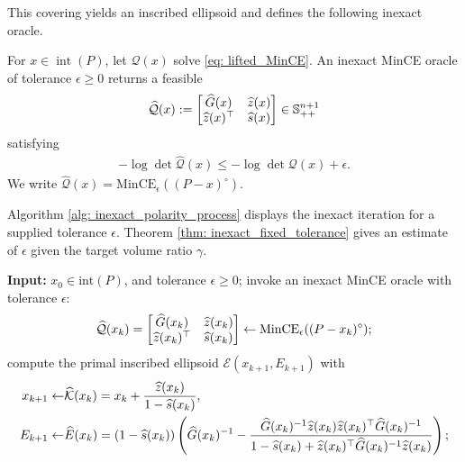 \documentclass[smallextended]{svjour3}
\newcommand{\K}{\mathcal{K}}
\newcommand{\E}{\mathcal{E}}
\newcommand{\wh}{\widehat}
\renewcommand{\S}{\mathbb{S}}
\begin{document}
This covering yields an inscribed ellipsoid and defines the following inexact
oracle.
\begin{definition}\label{def: inexact oracle}
    For $x\in\operatorname{int}(P)$, let $\mathcal Q(x)$ solve \eqref{eq: lifted_MinCE}.
    An inexact MinCE oracle of tolerance $\epsilon\geq0$ returns a feasible
    \begin{align}
        \widehat{\mathcal{Q}}(x) := \begin{bmatrix}
            \widehat{G}(x) & \widehat{z}(x) \\
            \widehat{z}(x)^\top & \widehat{s}(x)
        \end{bmatrix}
        \in \S^{n+1}_{++} \notag
    \end{align}
    satisfying
    \begin{align*}
            -\log \det \widehat{\mathcal{Q}}(x)   \leq  -\log \det \mathcal{Q}(x) + \epsilon.
    \end{align*}
    We write $\wh{\mathcal Q}(x)=\mathrm{MinCE}_{\epsilon}((P-x)^\circ)$.
\end{definition}

Algorithm \ref{alg: inexact_polarity_process} displays the inexact iteration for a supplied tolerance $\epsilon$. 
Theorem \ref{thm: inexact_fixed_tolerance} gives an estimate of $\epsilon$ given the target volume ratio $\gamma$. 
\begin{algorithm}[H]
\caption{Inexact Polarity Process}
\label{alg: inexact_polarity_process}
\begin{algorithmic}[1]
\State \textbf{Input:} $x_0\in\mathrm{int}(P)$, and tolerance $\epsilon\geq0$; 
\State invoke an inexact MinCE oracle with tolerance $\epsilon$:
\begin{align}
        \widehat{\mathcal{Q}}(x_k) = \begin{bmatrix}
            \widehat{G}(x_k) & \widehat{z}(x_k) \\
            \widehat{z}(x_k)^\top & \widehat{s}(x_k)
        \end{bmatrix}
        \gets \mathrm{MinCE}_{\epsilon}((P-x_k)^\circ); \notag
    \end{align}
\State compute the primal inscribed ellipsoid $\E(x_{k+1}, E_{k+1})$ with
\begin{align}
    x_{k+1} \gets & \wh{\K}(x_k) = x_k + \frac{\wh{z}(x_k)}{1-\wh{s}(x_k)}, \notag \\
    E_{k+1} \gets & \wh{E}(x_k) = (1-\wh{s}(x_k))  \left(\wh{G}(x_k)^{-1} - \frac{\wh{G}(x_k)^{-1}\wh{z}(x_k)\wh{z}(x_k)^{\top}\wh{G}(x_k)^{-1}}{1-\wh{s}(x_k) + \wh{z}(x_k)^\top \wh{G}(x_k)^{-1}\wh{z}(x_k)}\right)\notag;
\end{align}
\EndFor
\end{algorithmic}
\end{algorithm}
\end{document}
